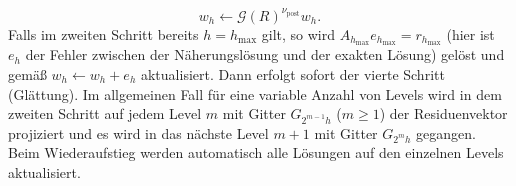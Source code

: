\documentclass[11pt,a4paper]{article}
\begin{document}
\begin{equation*}
    w_h \leftarrow \mathcal{G}(R)^{\nu_{\mathrm{post}}} w_h .
\end{equation*} Falls im zweiten Schritt bereits $h = h_{\mathrm{max}}$ gilt, so wird $A_{h_{\mathrm{max}}} e_{h_{\mathrm{max}}} = r_{h_{\mathrm{max}}}$ (hier ist $e_h$ der Fehler zwischen der Näherungslösung und der exakten Lösung) gelöst und gemäß $w_h \leftarrow w_h + e_h$ aktualisiert. Dann erfolgt sofort der vierte Schritt (Glättung).
Im allgemeinen Fall für eine variable Anzahl von Levels wird in dem zweiten Schritt auf jedem Level $m$ mit Gitter $G_{2^{m-1}h}$ ($m \geq 1$) der Residuenvektor projiziert und es wird in das nächste Level
$m+1$ mit Gitter $G_{2^m h}$ gegangen. Beim Wiederaufstieg werden automatisch alle Lösungen auf den einzelnen Levels aktualisiert.\newpage
\end{document}
